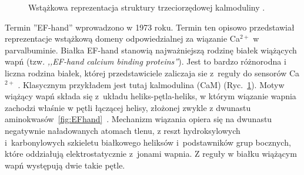 \begin{figure}[tb]
	\centering
	\centering
	\caption[Struktura kalmoduliny]{Wstążkowa reprezentacja struktury trzeciorzędowej kalmoduliny \cite{Babu1988,Kuboniwa1995}.}
	\label{fig:cam}
\end{figure}

Termin ''EF-hand'' wprowadzono w 1973 roku. Termin ten opisowo przedstawiał reprezentacje wstążkową domeny odpowiedzialnej za wiązanie Ca$^{2+}$ w parvalbuminie. Białka EF-hand stanowią najważniejszą rodzinę białek wiążących wapń (tzw. \textit{,,EF-hand calcium binding proteins''}). Jest to bardzo różnorodna i liczna rodzina białek, której przedstawiciele zaliczaja sie z~reguły do sensorów Ca$^{2+}$ \cite{Yanez2012}. Klasycznym przykładem jest tutaj kalmodulina (CaM) (Ryc.~\ref{fig:cam}). Motyw wiążący wapń składa się z~układu heliks-pętla-heliks, w którym wiązanie wapnia zachodzi właśnie w pętli łączącej helisy, złożonej zwykle z dwunastu aminokwasów~\ref{fig:EFhand}~\cite{Grabarek2006,Nelson2002}. Mechanizm wiązania opiera się na dwunastu negatywnie naładowanych atomach tlenu, z reszt hydroksylowych i~karbonylowych szkieletu białkowego heliksów i~podstawników grup bocznych, które oddziałują elektrostatycznie z~jonami wapnia. Z reguły w białku wiążącym wapń występują dwie takie pętle.

